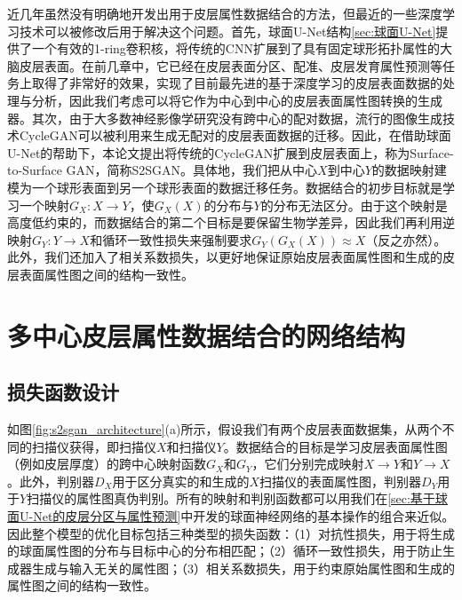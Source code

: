 近几年虽然没有明确地开发出用于皮层属性数据结合的方法，但最近的一些深度学习技术\cite{zhao2019spherical_ipmi,zhu2017unpaired}可以被修改后用于解决这个问题。首先，球面U-Net结构\ref{sec:球面U-Net}提供了一个有效的1-ring卷积核，将传统的CNN扩展到了具有固定球形拓扑属性的大脑皮层表面。在前几章中，它已经在皮层表面分区、配准、皮层发育属性预测等任务上取得了非常好的效果，实现了目前最先进的基于深度学习的皮层表面数据的处理与分析，因此我们考虑可以将它作为中心到中心的皮层表面属性图转换的生成器。其次，由于大多数神经影像学研究没有跨中心的配对数据，流行的图像生成技术CycleGAN\cite{zhu2017unpaired}可以被利用来生成无配对的皮层表面数据的迁移。因此，在借助球面U-Net的帮助下，本论文提出将传统的CycleGAN扩展到皮层表面上，称为Surface-to-Surface GAN，简称S2SGAN。具体地，我们把从中心$X$到中心$Y$的数据映射建模为一个球形表面到另一个球形表面的数据迁移任务。数据结合的初步目标就是学习一个映射$G_X:X\rightarrow Y$，使$G_X(X)$的分布与$Y$的分布无法区分。由于这个映射是高度低约束的，而数据结合的第二个目标是要保留生物学差异，因此我们再利用逆映射$G_Y: Y\rightarrow X$和循环一致性损失来强制要求$G_Y(G_X(X))\approx X$（反之亦然）。此外，我们还加入了相关系数损失，以更好地保证原始皮层表面属性图和生成的皮层表面属性图之间的结构一致性。	
	

\section{多中心皮层属性数据结合的网络结构}

\subsection{损失函数设计}
如图\ref{fig:s2sgan_architecture}(a)所示，假设我们有两个皮层表面数据集，从两个不同的扫描仪获得，即扫描仪$X$和扫描仪$Y$。数据结合的目标是学习皮层表面属性图（例如皮层厚度）的跨中心映射函数$G_X$和$G_Y$，它们分别完成映射$X\rightarrow Y$和$Y\rightarrow X$。此外，判别器$D_X$用于区分真实的和生成的$X$扫描仪的表面属性图，判别器$D_Y$用于$Y$扫描仪的属性图真伪判别。所有的映射和判别函数都可以用我们在\ref{sec:基于球面U-Net的皮层分区与属性预测}中开发的球面神经网络的基本操作的组合来近似。因此整个模型的优化目标包括三种类型的损失函数：（1）对抗性损失，用于将生成的球面属性图的分布与目标中心的分布相匹配；（2）循环一致性损失，用于防止生成器生成与输入无关的属性图；（3）相关系数损失，用于约束原始属性图和生成的属性图之间的结构一致性。
	

